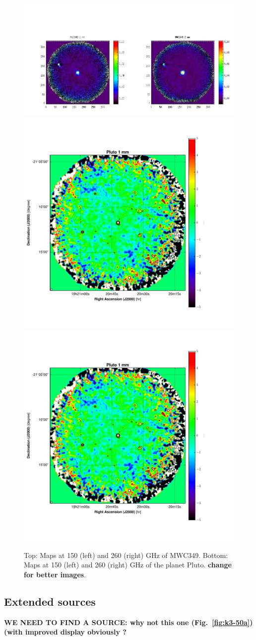 \documentclass[]{aa} %
\begin{document}
\begin{figure}[h]
   \centering
   \includegraphics[width=.95\linewidth]{MWC349_v0.jpeg}
        \includegraphics[width=.45\linewidth]{Pluto_1mm_map_snrcont.pdf}
    \includegraphics[width=.45\linewidth]{Pluto_1mm_map_snrcont.pdf}
      \caption{Top: Maps at 150 (left) and 260 (right) GHz of MWC349. Bottom: Maps at 150 (left) and 260 (right) GHz of the planet Pluto. {\bf change for better images}. 
         \label{fig_compact_sources}}
\end{figure}


\subsection{Extended sources}
{\bf WE NEED TO FIND A SOURCE: why not this one (Fig.~\ref{fig:k3-50a}) (with improved display obviously
?}
\end{document}
